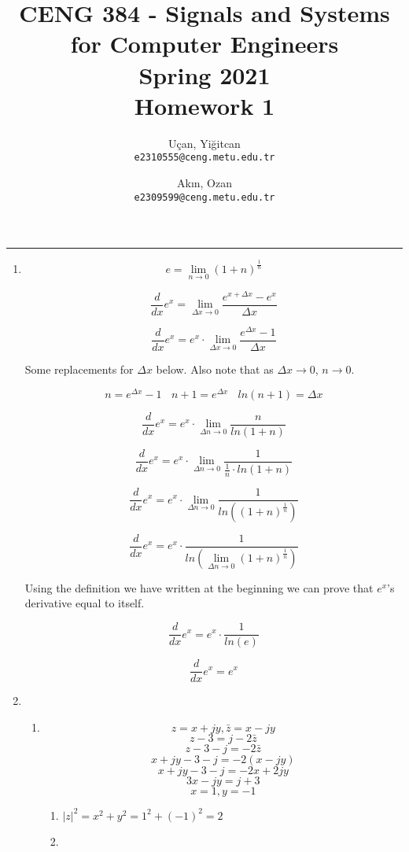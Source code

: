 \documentclass[10pt,a4paper, margin=1in]{article}
\author{ 
  Uçan, Yiğitcan\\
  \texttt{e2310555@ceng.metu.edu.tr}
  \and
  Akın, Ozan\\
  \texttt{e2309599@ceng.metu.edu.tr}
}
\title{CENG 384 - Signals and Systems for Computer Engineers \\
Spring 2021 \\
Homework 1}
\begin{document}
\maketitle


\noindent\rule{19cm}{1.2pt}

\begin{enumerate}

\item 

\[ e = \lim_{n\to0} (1+n)^{\frac{1}{n}} \]	

\[ \frac{d}{dx} e^x = \lim_{\Delta x\to 0} \frac{e^{x+\Delta x} - e^x}{\Delta x} \]	

\[ \frac{d}{dx} e^x = e^x \cdot \lim_{\Delta x\to 0} \frac{e^{\Delta x} - 1}{\Delta x} \]	

Some replacements for $\Delta x$ below. Also note that as $\Delta x\to 0$, $n\to 0$.

\[n = e^{\Delta x} - 1\ \ \ \  n + 1 = e^{\Delta x}\ \ \ \  ln(n+1) = \Delta x \]

\[ \frac{d}{dx} e^x = e^x \cdot \lim_{\Delta n\to 0} \frac{n}{ln(1+n)} \]

\[ \frac{d}{dx} e^x = e^x \cdot \lim_{\Delta n\to 0} \frac{1}{\frac{1}{n} \cdot ln(1+n)} \]	

\[ \frac{d}{dx} e^x = e^x \cdot \lim_{\Delta n\to 0} \frac{1}{ln((1+n)^\frac{1}{n})} \]

\[ \frac{d}{dx} e^x = e^x \cdot \frac{1}{ln(\lim_{\Delta n\to 0} (1+n)^\frac{1}{n})} \]

Using the definition we have written at the beginning we can prove that $e^x$'s derivative equal to itself.

\[ \frac{d}{dx} e^x = e^x \cdot \frac{1}{ln(e)} \]

\[ \frac{d}{dx} e^x = e^x \]	


\item %
    \begin{enumerate}
    \item 
        \[ z = x + jy, \bar {z} = x - jy \]
        \[ z - 3 = j - 2 \bar {z} \]
        \[ z - 3 - j = - 2 \bar {z} \]
        \[ x + jy - 3 - j = - 2 (x - jy) \]
        \[ x + jy - 3 - j = -2x + 2jy \]
        \[ 3x - jy = j + 3 \]
        \[ x = 1, y = -1 \]
        
\newpage
        
        \begin{enumerate}
            \item $|z|^2 = x^2 + y^2 = 1^2 + (-1)^2 = 2$
            \item ~ \\
            

\end{enumerate}
\end{enumerate}
\end{enumerate}
\end{document}
